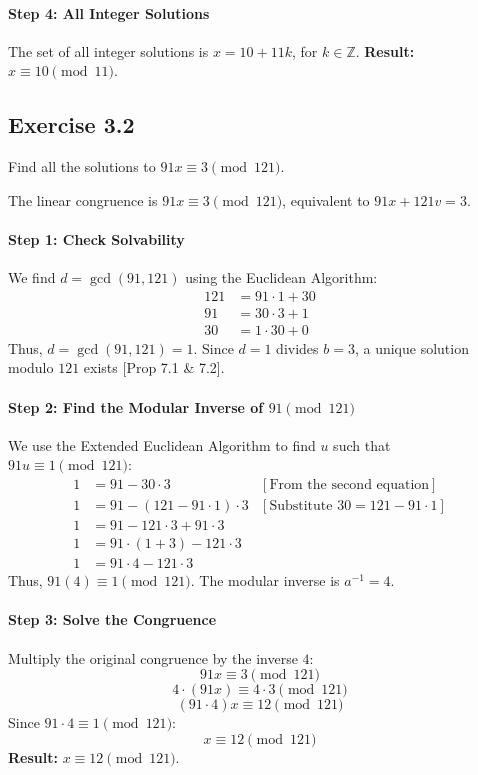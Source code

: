 \begin{solution}
\paragraph{Step 4: All Integer Solutions}
The set of all integer solutions is $x = 10 + 11k$, for $k \in \mathbb{Z}$.
\textbf{Result:} $x \equiv 10 \pmod{11}$.
\end{solution}
\newpage
\subsection*{Exercise 3.2}
Find all the solutions to $91x \equiv 3 \pmod{121}$.

\begin{solution}
The linear congruence is $91x \equiv 3 \pmod{121}$, equivalent to $91x + 121v = 3$.

\paragraph{Step 1: Check Solvability}
We find $d = \gcd(91, 121)$ using the Euclidean Algorithm:
\begin{align*}
    121 &= 91 \cdot 1 + 30 \\
    91 &= 30 \cdot 3 + 1 \\
    30 &= 1 \cdot 30 + 0
\end{align*}
Thus, $d = \gcd(91, 121) = 1$.
Since $d=1$ divides $b=3$, a unique solution modulo $121$ exists [Prop 7.1 \& 7.2].

\paragraph{Step 2: Find the Modular Inverse of $91 \pmod{121}$}
We use the Extended Euclidean Algorithm to find $u$ such that $91u \equiv 1 \pmod{121}$:
\begin{align*}
    1 &= 91 - 30 \cdot 3 & [\text{From the second equation}] \\
    1 &= 91 - (121 - 91 \cdot 1) \cdot 3 & [\text{Substitute } 30 = 121 - 91 \cdot 1] \\
    1 &= 91 - 121 \cdot 3 + 91 \cdot 3 \\
    1 &= 91 \cdot (1 + 3) - 121 \cdot 3 \\
    1 &= 91 \cdot 4 - 121 \cdot 3
\end{align*}
Thus, $91(4) \equiv 1 \pmod{121}$. The modular inverse is $a^{-1} = 4$.

\paragraph{Step 3: Solve the Congruence}
Multiply the original congruence by the inverse $4$:
$$ 91x \equiv 3 \pmod{121} $$
$$ 4 \cdot (91x) \equiv 4 \cdot 3 \pmod{121} $$
$$ (91 \cdot 4) x \equiv 12 \pmod{121} $$
Since $91 \cdot 4 \equiv 1 \pmod{121}$:
$$ x \equiv 12 \pmod{121} $$
\textbf{Result:} $x \equiv 12 \pmod{121}$.
\end{solution}
\newpage
